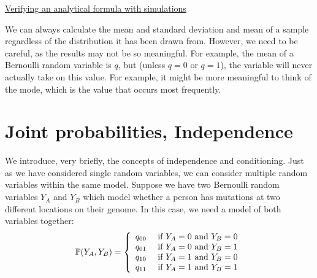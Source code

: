 \begin{exercise}
\href{https://colab.research.google.com/drive/1Gs-gSsUP1hHVwhrbwvWzLVm1ulcLJKRI#scrollTo=69BY8z2IRXnU&line=6&uniqifier=1}{Verifying an analytical formula with simulations}
\end{exercise}
%




We can always calculate the mean and standard deviation and mean of a sample regardless of the distribution it has been drawn from. However, we need to be careful, as the results may not be so meaningful. For example, the mean of a Bernoulli random variable is $q$, but (unless $q=0$ or $q=1$), the variable will never actually take on this value. For example, it might be more meaningful to think of the {\dfn mode}, which is the value that occurs most frequently. 






\section{Joint probabilities, Independence} We introduce, very briefly, the concepts of independence and conditioning. Just as we have considered single random variables, we can consider multiple random variables within the same model. Suppose we have two Bernoulli random variables $Y_A$ and $Y_B$ which model whether a person has mutations at two different locations on their genome. In this case, we need a model of both variables together:
\begin{equation}
\mathbb P(Y_A,Y_B) = \left\{ \begin{array}{cc}
q_{00} & \text{ if }Y_A=0 \text{ and } Y_B = 0\\
q_{01} & \text{ if }Y_A=0 \text{ and } Y_B = 1\\
q_{10} & \text{ if }Y_A=1 \text{ and } Y_B = 0\\
q_{11} & \text{ if }Y_A=1 \text{ and } Y_B = 1\\
\end{array}
 \right.
\end{equation}



